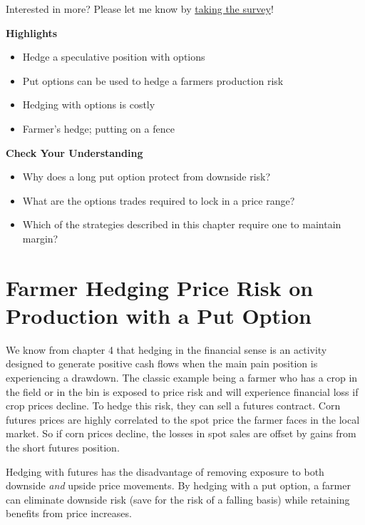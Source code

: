 \documentclass[
  letterpaper,
  DIV=11,
  numbers=noendperiod]{scrreprt}
\providecommand{\tightlist}{%
  \setlength{\itemsep}{0pt}\setlength{\parskip}{0pt}}\usepackage{longtable,booktabs,array}
\begin{document}
{Interested in more? Please let me know by}
\href{https://forms.gle/Q3VByCQZHjfQSy9D7}{taking the survey}!

\textbf{Highlights}

\begin{itemize}
\tightlist
\item
  Hedge a speculative position with options
\item
  Put options can be used to hedge a farmers production risk
\item
  Hedging with options is costly
\item
  Farmer's hedge; putting on a fence
\end{itemize}

\textbf{Check Your Understanding}

\begin{itemize}
\tightlist
\item
  Why does a long put option protect from downside risk?
\item
  What are the options trades required to lock in a price range?
\item
  Which of the strategies described in this chapter require one to
  maintain margin?
\end{itemize}

\hypertarget{farmer-hedging-price-risk-on-production-with-a-put-option}{%
\section{Farmer Hedging Price Risk on Production with a Put
Option}\label{farmer-hedging-price-risk-on-production-with-a-put-option}}

We know from chapter 4 that hedging in the financial sense is an
activity designed to generate positive cash flows when the main pain
position is experiencing a drawdown. The classic example being a farmer
who has a crop in the field or in the bin is exposed to price risk and
will experience financial loss if crop prices decline. To hedge this
risk, they can sell a futures contract. Corn futures prices are highly
correlated to the spot price the farmer faces in the local market. So if
corn prices decline, the losses in spot sales are offset by gains from
the short futures position.

Hedging with futures has the disadvantage of removing exposure to both
downside \emph{and} upside price movements. By hedging with a put
option, a farmer can eliminate downside risk (save for the risk of a
falling basis) while retaining benefits from price increases.
\end{document}

